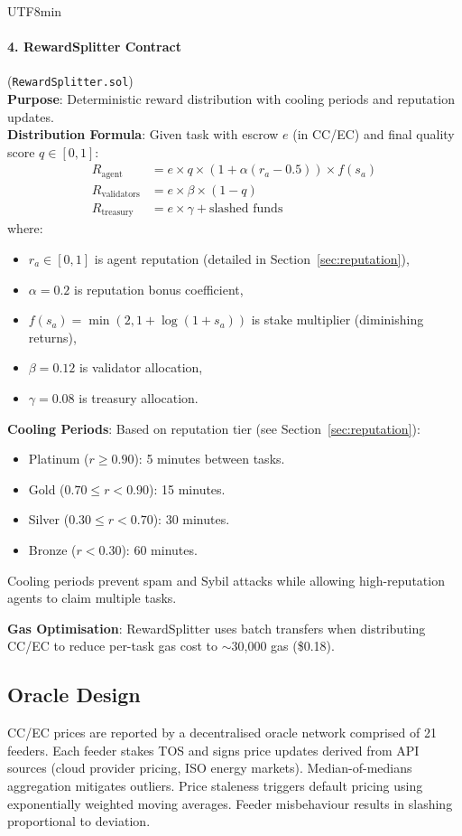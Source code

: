 \documentclass[11pt]{article}
\begin{document}
\begin{CJK}{UTF8}{min}
\paragraph{4. RewardSplitter Contract} (\texttt{RewardSplitter.sol})\\
\textbf{Purpose}: Deterministic reward distribution with cooling periods and reputation updates.\\
\textbf{Distribution Formula}: Given task with escrow $e$ (in CC/EC) and final quality score $q \in [0,1]$:
\begin{align}
R_{\text{agent}} &= e \times q \times \left(1 + \alpha (r_a - 0.5)\right) \times f(s_a) \label{eq:reward-agent} \\
R_{\text{validators}} &= e \times \beta \times (1-q) \label{eq:reward-validators} \\
R_{\text{treasury}} &= e \times \gamma + \text{slashed funds} \label{eq:reward-treasury}
\end{align}
where:
\begin{itemize}[noitemsep]
  \item $r_a \in [0,1]$ is agent reputation (detailed in Section~\ref{sec:reputation}),
  \item $\alpha = 0.2$ is reputation bonus coefficient,
  \item $f(s_a) = \min(2, 1 + \log(1+s_a))$ is stake multiplier (diminishing returns),
  \item $\beta = 0.12$ is validator allocation,
  \item $\gamma = 0.08$ is treasury allocation.
\end{itemize}
\textbf{Cooling Periods}: Based on reputation tier (see Section~\ref{sec:reputation}):
\begin{itemize}[noitemsep]
  \item Platinum ($r \geq 0.90$): 5 minutes between tasks.
  \item Gold ($0.70 \leq r < 0.90$): 15 minutes.
  \item Silver ($0.30 \leq r < 0.70$): 30 minutes.
  \item Bronze ($r < 0.30$): 60 minutes.
\end{itemize}
Cooling periods prevent spam and Sybil attacks while allowing high-reputation agents to claim multiple tasks.

\textbf{Gas Optimisation}: RewardSplitter uses batch transfers when distributing CC/EC to reduce per-task gas cost to $\sim$30,000 gas (\$0.18).

\subsection{Oracle Design}
CC/EC prices are reported by a decentralised oracle network comprised of 21 feeders. Each feeder stakes TOS and signs price updates derived from API sources (cloud provider pricing, ISO energy markets). Median-of-medians aggregation mitigates outliers. Price staleness triggers default pricing using exponentially weighted moving averages. Feeder misbehaviour results in slashing proportional to deviation.


\end{CJK}
\end{document}
